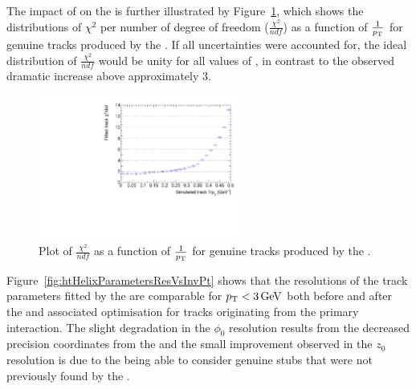 The impact of \MS on the \KF is further illustrated by Figure~\ref{fig:2GeVFlatChi2Ndf}, which shows the distributions of $\chi^{2}$ per number of degree of freedom ($\frac{\chi^{2}}{ndf}$) as a function of $\frac{1}{p_{\mathrm{T}}}$ for genuine tracks produced by the \KF.
If all uncertainties were accounted for, the ideal distribution of $\frac{\chi^{2}}{ndf}$ would be unity for all values of \pT, in contrast to the observed dramatic increase above approximately 3\GeV.

\begin{figure}[htb]
\centering
\includegraphics[width=0.60\textwidth]{figs/tk-upgrade/results-lowPtTracking/kfChi2NdfVsInvPtFlatGeometry_5000.pdf}
\caption{Plot of $\frac{\chi^{2}}{ndf}$ as a function of $\frac{1}{p_{\mathrm{T}}}$ for genuine tracks produced by the \KF.}
\label{fig:2GeVFlatChi2Ndf}
\end{figure}

Figure~\ref{fig:htHelixParametersResVsInvPt} shows that the resolutions of the track parameters fitted by the \KF are comparable for $p_{\mathrm{T}} < 3\,\text{Ge\hspace{-.08em}V}$ both before and after the \HT and associated \KF optimisation for tracks originating from the primary interaction.
The slight degradation in the $\phi_{0}$ resolution results from the decreased precision coordinates from the \HT and the small improvement observed in the $z_{0}$ resolution is due to the \KF being able to consider genuine stubs that were not previously found by the \HT.


